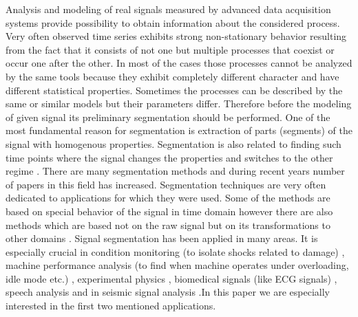 \documentclass[10pt]{article}
\begin{document}
Analysis and modeling of real signals measured by advanced data acquisition systems provide possibility to obtain information about the considered process. Very often observed time series exhibits strong non-stationary behavior resulting from the fact that it consists of not one but multiple processes that coexist or occur one after the other.  In most of the cases those processes cannot be analyzed by the same tools because they exhibit completely different character and have different statistical properties. Sometimes the processes can be described by the same or similar models but their parameters differ. Therefore before the modeling of given signal its preliminary segmentation should be performed.
One of the most fundamental reason for segmentation is extraction of parts (segments) of the signal with homogenous properties. Segmentation is also related to finding such time points where the signal changes the properties and switches to the other regime \cite{lopatka2005non,wylomanska2015identification,gajda44regime,wylomanska2014signal}. 
There are many segmentation methods and during recent years number of papers in this field  has increased. Segmentation techniques are very often dedicated to applications for which they were used. Some of the methods are based on special behavior of the signal in time domain \cite{lopatka2005non,gajda44regime,makowski2013procedure} however there are also methods which are based not on the raw signal but on its transformations to other domains \cite{obuchowski2014local}.
Signal segmentation has been applied in many areas. It is especially crucial in condition monitoring (to isolate shocks related to damage) \cite{obuchowski2014local}, machine performance analysis (to find when machine operates under overloading, idle mode etc.) \cite{wylomanska2014signal}, experimental physics \cite{gajda44regime}, biomedical signals (like ECG signals) \cite{azami2012improved}, speech analysis \cite{makowski2014automatic} and in seismic signal analysis \cite{popescu2014signal}.In this paper we are especially interested in the first two mentioned applications.
\end{document}

